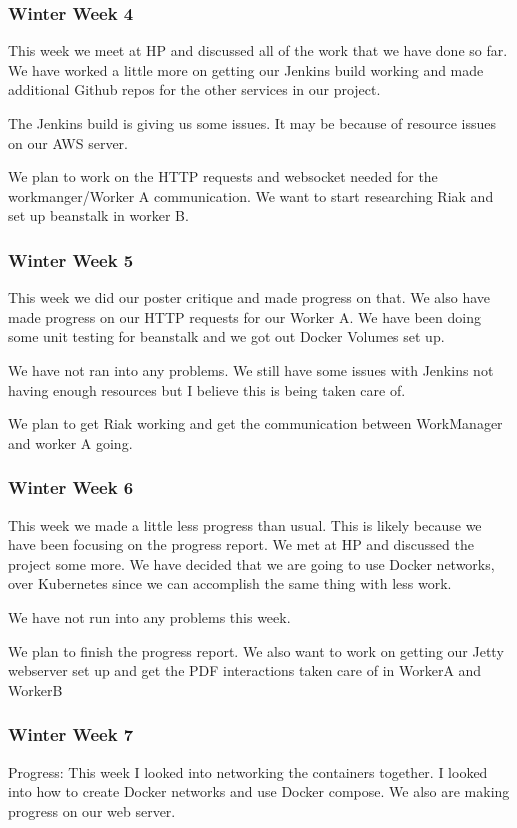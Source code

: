 \documentclass[onecolumn, draftclsnofoot,10pt, compsoc]{IEEEtran}
\begin{document}
\subsubsection*{Winter Week 4}
This week we meet at HP and discussed all of the work that we have done so far. We have worked a little more on getting our Jenkins build working and made additional Github repos for the other services in our project.

The Jenkins build is giving us some issues. It may be because of resource issues on our AWS server.

We plan to work on the HTTP requests and websocket needed for the workmanger/Worker A communication. We want to start researching Riak and set up beanstalk in worker B.
\subsubsection*{Winter Week 5}
This week we did our poster critique and made progress on that. We also have made progress on our HTTP requests for our Worker A. We have been doing some unit testing for beanstalk and we got out Docker Volumes set up.

We have not ran into any problems. We still have some issues with Jenkins not having enough resources but I believe this is being taken care of.

We plan to get Riak working and get the communication between WorkManager and worker A going.
\subsubsection*{Winter Week 6}
This week we made a little less progress than usual. This is likely because we have been focusing on the progress report. We met at HP and discussed the project some more. We have decided that we are going to use Docker networks, over Kubernetes since we can accomplish the same thing with less work.

We have not run into any problems this week. 

We plan to finish the progress report. We also want to work on getting our Jetty webserver set up and get the PDF interactions taken care of in WorkerA and WorkerB
\subsubsection*{Winter Week 7}
Progress: This week I looked into networking the containers together. I looked into how to create Docker networks and use Docker compose. We also are making progress on our web server.
\end{document}

